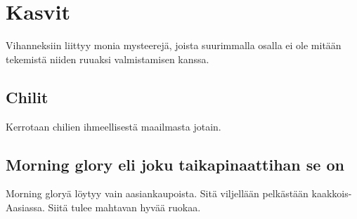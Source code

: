 \documentclass[../keittiokirja.tex]{subfiles}
\begin{document}
\section{Kasvit}
\label{sec:kasvit}

Vihanneksiin liittyy monia mysteerejä, joista suurimmalla osalla ei ole mitään tekemistä niiden 
ruuaksi valmistamisen kanssa. 


\blindtext

\subsection{Chilit}

Kerrotaan chilien ihmeellisestä maailmasta jotain.


\blindtext

\subsection{Morning glory eli joku taikapinaattihan se on}

Morning gloryä löytyy vain aasiankaupoista. Sitä viljellään pelkästään kaakkois-Aasiassa.
Siitä tulee mahtavan hyvää ruokaa.

\blindtext
\end{document}
